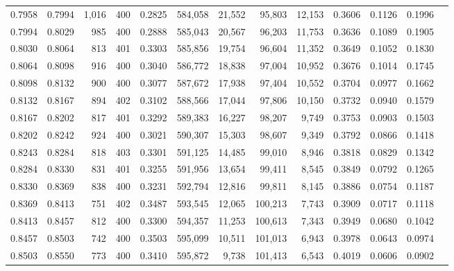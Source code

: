 \begin{tabular}{rrrrrrrrrrrrr}
0.7958 & 0.7994 & 1,016 & 400 &                                     0.2825 & 584,058 &  21,552 &  95,803 &  12,153 & 0.3606 & 0.1126 & 0.1996 \\
0.7994 & 0.8029 &   985 & 400 &                                     0.2888 & 585,043 &  20,567 &  96,203 &  11,753 & 0.3636 & 0.1089 & 0.1905 \\
0.8030 & 0.8064 &   813 & 401 &                                     0.3303 & 585,856 &  19,754 &  96,604 &  11,352 & 0.3649 & 0.1052 & 0.1830 \\
0.8064 & 0.8098 &   916 & 400 &                                     0.3040 & 586,772 &  18,838 &  97,004 &  10,952 & 0.3676 & 0.1014 & 0.1745 \\
0.8098 & 0.8132 &   900 & 400 &                                     0.3077 & 587,672 &  17,938 &  97,404 &  10,552 & 0.3704 & 0.0977 & 0.1662 \\
0.8132 & 0.8167 &   894 & 402 &                                     0.3102 & 588,566 &  17,044 &  97,806 &  10,150 & 0.3732 & 0.0940 & 0.1579 \\
0.8167 & 0.8202 &   817 & 401 &                                     0.3292 & 589,383 &  16,227 &  98,207 &   9,749 & 0.3753 & 0.0903 & 0.1503 \\
0.8202 & 0.8242 &   924 & 400 &                                     0.3021 & 590,307 &  15,303 &  98,607 &   9,349 & 0.3792 & 0.0866 & 0.1418 \\
0.8243 & 0.8284 &   818 & 403 &                                     0.3301 & 591,125 &  14,485 &  99,010 &   8,946 & 0.3818 & 0.0829 & 0.1342 \\
0.8284 & 0.8330 &   831 & 401 &                                     0.3255 & 591,956 &  13,654 &  99,411 &   8,545 & 0.3849 & 0.0792 & 0.1265 \\
0.8330 & 0.8369 &   838 & 400 &                                     0.3231 & 592,794 &  12,816 &  99,811 &   8,145 & 0.3886 & 0.0754 & 0.1187 \\
0.8369 & 0.8413 &   751 & 402 &                                     0.3487 & 593,545 &  12,065 & 100,213 &   7,743 & 0.3909 & 0.0717 & 0.1118 \\
0.8413 & 0.8457 &   812 & 400 &                                     0.3300 & 594,357 &  11,253 & 100,613 &   7,343 & 0.3949 & 0.0680 & 0.1042 \\
0.8457 & 0.8503 &   742 & 400 &                                     0.3503 & 595,099 &  10,511 & 101,013 &   6,943 & 0.3978 & 0.0643 & 0.0974 \\
0.8503 & 0.8550 &   773 & 400 &                                     0.3410 & 595,872 &   9,738 & 101,413 &   6,543 & 0.4019 & 0.0606 & 0.0902 \\

\end{tabular}
